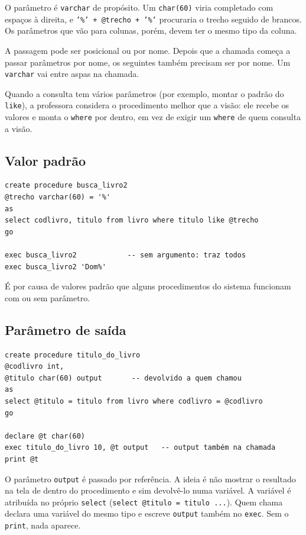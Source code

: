 O parâmetro é \texttt{varchar} de propósito. Um \texttt{char(60)} viria
completado com espaços à direita, e \texttt{'\%' + @trecho + '\%'}
procuraria o trecho seguido de brancos. Os parâmetros que vão para
colunas, porém, devem ter o mesmo tipo da coluna.

A passagem pode ser posicional ou por nome. Depois que a chamada começa
a passar parâmetros por nome, os seguintes também precisam ser por nome.
Um \texttt{varchar} vai entre aspas na chamada.

Quando a consulta tem vários parâmetros (por exemplo, montar o padrão do
\texttt{like}), a professora considera o procedimento melhor que a
visão: ele recebe os valores e monta o \texttt{where} por dentro, em vez
de exigir um \texttt{where} de quem consulta a visão.

\subsection{Valor padrão}

\begin{lstlisting}
create procedure busca_livro2
@trecho varchar(60) = '%'
as
select codlivro, titulo from livro where titulo like @trecho
go

exec busca_livro2            -- sem argumento: traz todos
exec busca_livro2 'Dom%'
\end{lstlisting}

É por causa de valores padrão que alguns procedimentos do sistema
funcionam com ou sem parâmetro.

\subsection{Parâmetro de saída}

\begin{lstlisting}
create procedure titulo_do_livro
@codlivro int,
@titulo char(60) output       -- devolvido a quem chamou
as
select @titulo = titulo from livro where codlivro = @codlivro
go

declare @t char(60)
exec titulo_do_livro 10, @t output   -- output também na chamada
print @t
\end{lstlisting}

O parâmetro \texttt{output} é passado por referência. A ideia é não
mostrar o resultado na tela de dentro do procedimento e sim devolvê-lo
numa variável. A variável é atribuída no próprio \texttt{select}
(\texttt{select @titulo = titulo ...}). Quem chama declara uma variável
do mesmo tipo e escreve \texttt{output} também no \texttt{exec}. Sem o
\texttt{print}, nada aparece.

